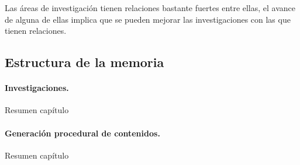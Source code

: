 Las áreas de investigación tienen relaciones bastante fuertes entre ellas, el avance de alguna de ellas implica que se pueden mejorar las investigaciones con las que tienen relaciones.\\


%
%
\subsection*{Estructura de la memoria}

\paragraph*{Investigaciones.}
Resumen capítulo

\paragraph*{Generación procedural de contenidos.}
Resumen capítulo
